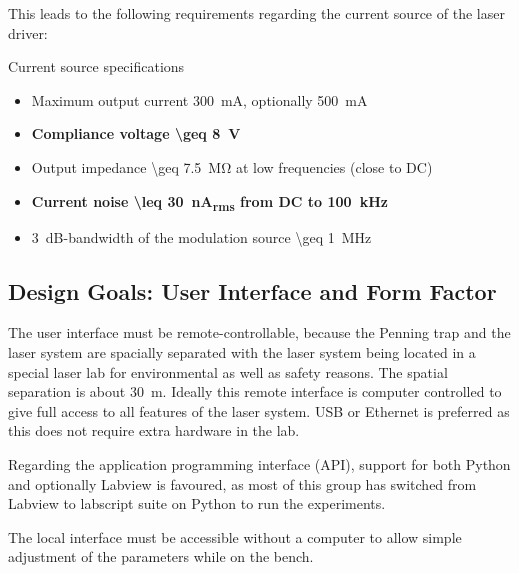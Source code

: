 This leads to the following requirements regarding the current source of the laser driver:

\begin{center}
    \begin{specifications}[label={lst:dgDrive_specs_electrical}]{Current source specifications}
    \begin{itemize}
        \item Maximum output current \qty{300}{\mA}, optionally \qty{500}{\mA}
        \item \textbf{Compliance voltage \qty[text-series-to-math, reset-text-series = false, reset-math-version = false]{\geq 8}{\V}}
        \item Output impedance \qty{\geq 7.5}{\mega \ohm} at low frequencies (close to DC)
        \item \textbf{Current noise \qty[text-series-to-math, reset-text-series = false, reset-math-version = false]{\leq 30}{\nA_{rms}} from DC to \qty[text-series-to-math, reset-text-series = false, reset-math-version = false]{100}{\kHz}}
        \item \qty{3}{\dB}-bandwidth of the modulation source \qty{\geq 1}{\MHz}
    \end{itemize}
    \end{specifications}
\end{center}

\clearpage
\subsection{Design Goals: User Interface and Form Factor}
The user interface must be remote-controllable, because the Penning trap and the laser system are spacially separated with the laser system being located in a special laser lab for environmental as well as safety reasons. The spatial separation is about \qty{30}{\meter}. Ideally this remote interface is computer controlled to give full access to all features of the laser system. USB or Ethernet is preferred as this does not require extra hardware in the lab.

Regarding the application programming interface (API), support for both Python and optionally Labview is favoured, as most of this group has switched from Labview to labscript suite \cite{labscript_2013} on Python to run the experiments.

The local interface must be accessible without a computer to allow simple adjustment of the parameters while on the bench.

